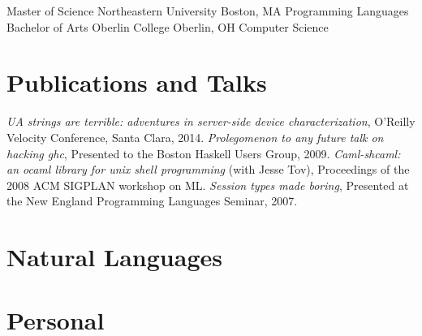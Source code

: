 \documentclass[10pt,letterpaper,sans]{moderncv}
\begin{document}
        {Master of Science}
        {Northeastern University}
        {Boston, MA}
        {}
        {Programming Languages}
        {Bachelor of Arts}
        {Oberlin College}
        {Oberlin, OH}
        {}
        {Computer Science}

\section{Publications and Talks}

\cvitem{}
 {\emph{UA strings are terrible: adventures in server-side device characterization},
   O'Reilly Velocity Conference, Santa Clara, 2014.}
\cvitem{}
 {\emph{Prolegomenon to any future talk on hacking ghc},
  Presented to the Boston Haskell Users Group, 2009.}
\cvitem{}
 {\emph{Caml-shcaml: an ocaml library for unix shell programming} (with Jesse Tov),
  Proceedings of the 2008 ACM SIGPLAN workshop on ML.}
\cvitem{}
 {\emph{Session types made boring},
  Presented at the New England Programming Languages Seminar, 2007.}

\section{Natural Languages}

  
\section{Personal}

\end{document}
